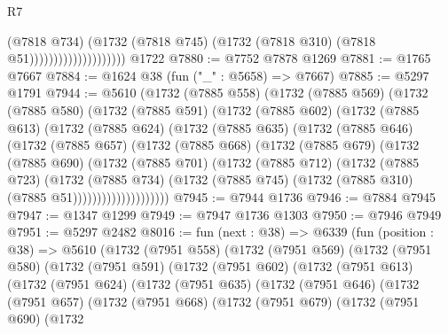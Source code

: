 \begin{lexlean}{R7}
\begin{coremodule}
                                      (@7818 @734)
                                      (@1732
                                        (@7818 @745)
                                        (@1732 (@7818 @310) (@7818 @51))))))))))))))))))))
    @1722
@7880 := @7752 @7878 @1269
@7881 := @1765 @7667
@7884 := @1624 @38 (fun ("_" : @5658) => @7667)
@7885 := @5297 @1791
@7944 := @5610
    (@1732
      (@7885 @558)
      (@1732
        (@7885 @569)
        (@1732
          (@7885 @580)
          (@1732
            (@7885 @591)
            (@1732
              (@7885 @602)
              (@1732
                (@7885 @613)
                (@1732
                  (@7885 @624)
                  (@1732
                    (@7885 @635)
                    (@1732
                      (@7885 @646)
                      (@1732
                        (@7885 @657)
                        (@1732
                          (@7885 @668)
                          (@1732
                            (@7885 @679)
                            (@1732
                              (@7885 @690)
                              (@1732
                                (@7885 @701)
                                (@1732
                                  (@7885 @712)
                                  (@1732
                                    (@7885 @723)
                                    (@1732
                                      (@7885 @734)
                                      (@1732
                                        (@7885 @745)
                                        (@1732 (@7885 @310) (@7885 @51))))))))))))))))))))
@7945 := @7944 @1736
@7946 := @7884 @7945
@7947 := @1347 @1299
@7949 := @7947 @1736 @1303
@7950 := @7946 @7949
@7951 := @5297 @2482
@8016 := fun (next : @38) =>
  @6339
    (fun (position : @38) =>
    @5610
      (@1732
        (@7951 @558)
        (@1732
          (@7951 @569)
          (@1732
            (@7951 @580)
            (@1732
              (@7951 @591)
              (@1732
                (@7951 @602)
                (@1732
                  (@7951 @613)
                  (@1732
                    (@7951 @624)
                    (@1732
                      (@7951 @635)
                      (@1732
                        (@7951 @646)
                        (@1732
                          (@7951 @657)
                          (@1732
                            (@7951 @668)
                            (@1732
                              (@7951 @679)
                              (@1732
                                (@7951 @690)
                                (@1732

\end{coremodule}
\end{lexlean}

